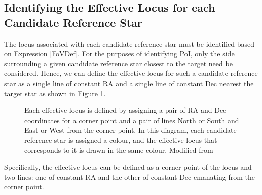 \documentclass{aa}
\begin{document}
\subsection{Identifying the Effective Locus for each Candidate Reference Star}
\label{identifying-the-effective-locus-for-each-candidate-reference-star}

The locus associated with each candidate reference star must be
identified based on Expression \ref{FoVDef}. For the purposes of identifying PoI, only the side surrounding a given candidate reference
star closest to the target need be considered. Hence, we can define the
effective locus for such a candidate reference star as a single line of
constant RA and a single line of constant Dec nearest the target star
as shown in Figure \ref{effective_locus}.

\begin{figure}
\caption{\label{effective_locus}Each effective locus is defined by assigning a pair
of RA and Dec coordinates for a corner point and a pair of lines North
or South and East or West from the corner point. In this diagram, each
candidate reference star is assigned a colour, and the effective locus
that corresponds to it is drawn in the same colour. Modified from \citet{creaner2016thesis}}
\end{figure}

Specifically, the effective locus can be defined as a corner point of
the locus and two lines: one of constant RA and the other of constant
Dec emanating from the corner point. 
\end{document}
